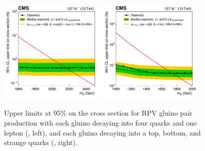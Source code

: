 \begin{figure}[!hbtp]
\centering
    \includegraphics[width=0.45\textwidth]{figs/ssp/scan_rpv_t1qqqql.pdf}
\includegraphics[width=0.45\textwidth]{figs/ssp/scan_rpv_t1tbs.pdf}\\
\caption{
          Upper limits at 95\% \CL on the cross section for RPV gluino pair production with each gluino decaying into four quarks and one lepton (\ToqqqqL, left), and
    each gluino decaying into a top, bottom, and strange quarks (\Totbs, right).
    }
\label{fig:rpvlimits}
\end{figure}



